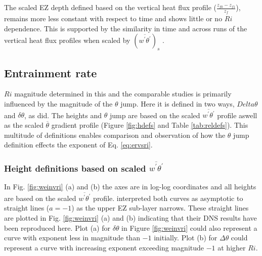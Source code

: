 \documentclass[referee]{svjour3}
\begin{document}
The scaled EZ depth defined based on the vertical heat flux profile ($\frac{z_{f0}-z_{f1}}{z_{f}}$), remains more less constant with respect to time and shows little or no $Ri$ dependence.  This is supported by the similarity in time and across runs of the vertical heat flux profiles when scaled by $(\overline{w^{'}\theta^{'}})_{s}$ \citep{NChap14}.

\subsection{Entrainment rate}

$Ri$ magnitude determined in this and the comparable studies is primarily influenced by the magnitude of the $\theta$ jump.  Here it is defined in two ways, $Delta \theta$ and $\delta \theta$, as \cite{FedConzMir04} did.  The heights and $\theta$ jump are based on the scaled $\overline{w^{'}\theta^{'}}$ profile aswell as the scaled $\overline{\theta}$ gradient profile (Figure \ref{fig:hdefs} and Table \ref{tab:reldefs}).  This multitude of definitions enables comparison and observation of how the $\theta$ jump definition effects the exponent of Eq. \ref{eq:ervsri}.

\subsubsection{Height definitions based on scaled $\overline{w^{'}\theta^{'}}$}
In Fig. \ref{fig:weinvri} (a) and (b) the axes are in log-log coordinates and all heights are based on the scaled $\overline{w^{'}\theta^{'}}$ profile.  \cite{GarciaMellado} interpreted both curves as asymptotic to straight lines ($a=-1$) as the upper EZ sub-layer narrows.  These straight lines are plotted in Fig. \ref{fig:weinvri} (a) and (b) indicating that their DNS results have been reproduced here.   Plot (a) for $\delta \theta$ in Figure \ref{fig:weinvri} could also represent a curve with exponent less in magnitude than $-1$ initially.  Plot (b) for $\Delta \theta$ could represent a curve with increasing exponent exceeding magnitude $-1$ at higher $Ri$.\\
\end{document}
